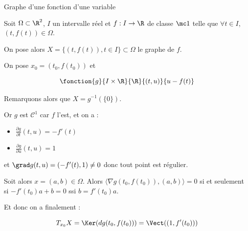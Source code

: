 \begin{exemple} 
    Graphe d'une fonction d'une variable 

    Soit $\Omega \subset \R^2$, $I$ un intervalle réel et $f : I \to \R$ de classe 
    $\mc 1$ telle que {$\forall t \in I$, $(t, f(t)) \in \Omega$.}
    
    On pose alors $X = \{(t, f(t)), t \in I\} \subset \Omega$ le graphe de $f$. 

    On pose $x_0 = (t_0, f(t_0))$ et 
    
    $$\fonction{g}{I \times \R}{\R}{(t, u)}{u - f(t)}$$
    
    Remarquons alors que $X = g^{-1}(\{0\})$.


    Or $g$ est $\mathscr C^1$ car $f$ l'est, et on a : 
    \begin{itemize}
        \item $\displaystyle \frac{\partial g}{\partial t}(t, u) = - f'(t)$
        \item $\displaystyle \frac{\partial g}{\partial u}(t, u) = 1$
    \end{itemize}

    et $\grad g (t, u) = (- f'(t), 1) \neq 0$ donc tout point est régulier.
    
    Soit alors $x = (a, b) \in \Omega$. Alors $\langle \nabla g(t_0, f(t_0)), (a, b) \rangle = 0$
    si et seulement si $- f'(t_0) a + b = 0$ ssi $b = f'(t_0) a$.

    Et donc on a finalement :
    
    $$T_{x_0}X = \Ker(dg(t_0, f(t_0))) = \Vect((1, f'(t_0)))$$
\end{exemple}

